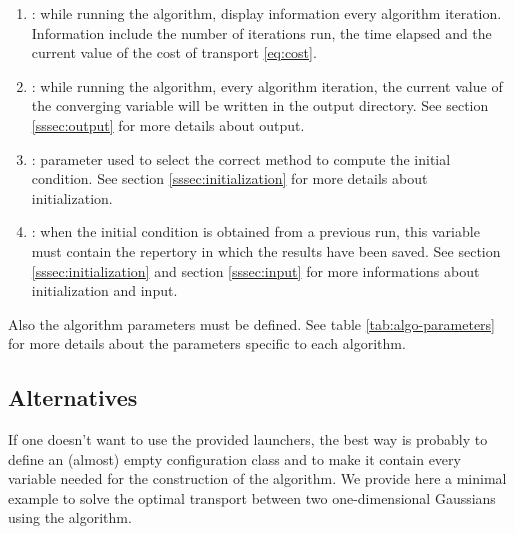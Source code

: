 \begin{enumerate}
            \item {}: while running the algorithm, display information every  algorithm iteration. Information include
                the number of iterations run, the time elapsed and the current value of the cost of transport \eqref{eq:cost}.
            \item {}: while running the algorithm, every  algorithm iteration, the current value of the 
                converging variable will be written
                in the output directory. See section \ref{sssec:output} for more details about output.
            \item {}: parameter used to select the correct method to compute the initial condition. See section \ref{sssec:initialization}
                for more details about initialization.
            \item {}: when the initial condition is obtained from a previous run, this variable must contain the repertory 
                in which the results have been saved. See section \ref{sssec:initialization} and section \ref{sssec:input} for more
                informations about initialization and input.
        \end{enumerate}

        Also the algorithm parameters must be defined. See table \ref{tab:algo-parameters} for more details about the parameters
        specific to each algorithm.

        

    \subsection{Alternatives}
    \noindent

        If one doesn't want to use the provided \python{} launchers, the best way is probably to define an (almost) empty configuration class
        and to make it contain every variable needed for the construction of the algorithm. We provide here a minimal example to solve the
        optimal transport between two one-dimensional Gaussians using
        the \pdAlgo{} algorithm.

        \lstset{style=codepython}
        

